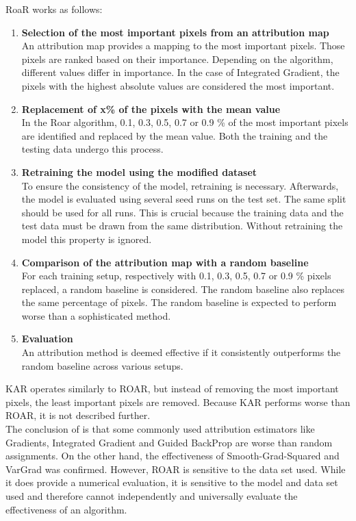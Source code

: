 RoaR works as follows:
\begin{enumerate}
	\item \textbf{ Selection of the most important pixels from an attribution map}\\
	An attribution map provides a mapping to the most important pixels. Those pixels are ranked based on their importance. Depending on the algorithm, different values differ in importance. In the case of Integrated Gradient, the pixels with the highest absolute values are considered the most important.
	\item \textbf{ Replacement of x\% of the pixels with the mean value}\\
	In the Roar algorithm, 0.1, 0.3, 0.5, 0.7 or 0.9 \% of the most important pixels are identified and replaced by the mean value. Both the training and the testing data undergo this process.
	\item \textbf{ Retraining the model using the modified dataset}\\
	To ensure the consistency of the model, retraining is necessary. Afterwards, the model is evaluated using several seed runs on the test set. The same split should be used for all runs.
	This is crucial because the training data and the test data must be drawn from the same distribution. Without retraining the model this property is ignored.
	\item \textbf{ Comparison of the attribution map with a random baseline} \\
	For each training setup, respectively with 0.1, 0.3, 0.5, 0.7 or 0.9 \% pixels replaced, a random baseline is considered. The random baseline also replaces the same percentage of pixels. The random baseline is expected to perform worse than a sophisticated method.
	\item \textbf{ Evaluation} \\
	An attribution method is deemed effective if it consistently outperforms the random baseline across various setups.
\end{enumerate}

KAR operates similarly to ROAR, but instead of removing the most important pixels, the least important pixels are removed. Because KAR performs worse than ROAR, it is not described further.
\\
The conclusion of \cite{hooker2019benchmark} is that some commonly used attribution estimators like Gradients, Integrated Gradient and Guided BackProp are worse than random assignments. On the other hand, the effectiveness of Smooth-Grad-Squared and VarGrad was confirmed. However, ROAR is sensitive to the data set used. While it does provide a numerical evaluation, it is sensitive to the model and data set used and therefore cannot independently and universally evaluate the effectiveness of an algorithm.


